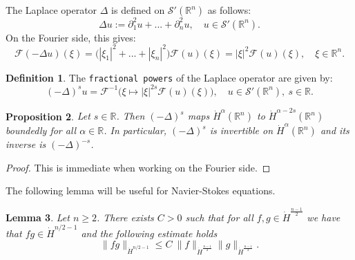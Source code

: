 \documentclass[a4paper, 12pt]{article}
\theoremstyle{plain}
\newtheorem{proposition}{Proposition}[section]
\newtheorem{lemma}[proposition]{Lemma}
\theoremstyle{definition}
\newtheorem{definition}[proposition]{Definition}
\theoremstyle{remark}
\numberwithin{equation}{section}
\begin{document}
The Laplace operator $\Delta$ is defined on ${\mathscr{S}}'({\mathds{R}}^n)$ as follows:
\[
\Delta u := \partial_1^2u+...+\partial_n^2u, \quad u\in {\mathscr{S}}'({\mathds{R}}^n).
\]
On the Fourier side, this gives:
\[
{\mathscr{F}}(-\Delta u)(\xi)=\bigl(|\xi_1|^2+...+|\xi_n|^2\bigr){\mathscr{F}}(u)(\xi) = |\xi|^2{\mathscr{F}}(u)(\xi), \quad \xi\in{\mathds{R}}^n.
\]

\begin{definition}
The {\tt fractional powers} of the Laplace operator are given by:
\[
(-\Delta)^su = {\mathscr{F}}^{-1}\bigl(\xi\mapsto |\xi|^{2s}{\mathscr{F}}(u)(\xi)\bigr),\quad u\in {\mathscr{S}}'({\mathds{R}}^n),\ s\in{\mathds{R}}.
\]
\end{definition}

\begin{proposition}
Let $s\in{\mathds{R}}$. Then $(-\Delta)^s$ maps $\dot H^\alpha({\mathds{R}}^n)$ to $\dot H^{\alpha-2s}({\mathds{R}}^n)$ boundedly for all
$\alpha\in{\mathds{R}}$. In particular, $(-\Delta)^s$ is invertible on $\dot H^\alpha({\mathds{R}}^n)$ and its inverse is $(-\Delta)^{-s}$.
\end{proposition}

\begin{proof}
This is immediate when working on the Fourier side.
\end{proof}

The following lemma will be useful for Navier-Stokes equations.

\begin{lemma}
\label{lem:multSobolev}
Let $n\ge 2$. There exists $C>0$ such that for all $f,g\in \dot H^{\frac{n-1}{2}}$ we have that $fg\in\dot H^{n/2-1}$ and
the following estimate holds
\[
\|fg\|_{\dot H^{n/2-1}}\le C\ \|f\|_{\dot H^{\frac{n-1}{2}}}\|g\|_{\dot H^{\frac{n-1}{2}}}.
\]
\end{lemma}
\end{document}
